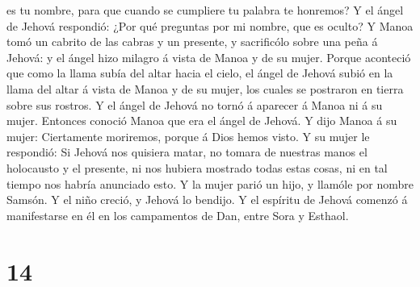 es tu nombre, para que cuando se cumpliere tu palabra te honremos?
 Y el ángel de Jehová respondió: ¿Por qué preguntas por
mi nombre, que es oculto?  Y Manoa tomó un cabrito de las
cabras y un presente, y sacrificólo sobre una peña á Jehová: y el ángel
hizo milagro á vista de Manoa y de su mujer.  Porque
aconteció que como la llama subía del altar hacia el cielo, el ángel de
Jehová subió en la llama del altar á vista de Manoa y de su mujer, los
cuales se postraron en tierra sobre sus rostros.  Y el
ángel de Jehová no tornó á aparecer á Manoa ni á su mujer. Entonces
conoció Manoa que era el ángel de Jehová.  Y dijo Manoa á
su mujer: Ciertamente moriremos, porque á Dios hemos visto.
 Y su mujer le respondió: Si Jehová nos quisiera matar,
no tomara de nuestras manos el holocausto y el presente, ni nos hubiera
mostrado todas estas cosas, ni en tal tiempo nos habría anunciado esto.
 Y la mujer parió un hijo, y llamóle por nombre Samsón. Y
el niño creció, y Jehová lo bendijo.  Y el espíritu de
Jehová comenzó á manifestarse en él en los campamentos de Dan, entre
Sora y Esthaol.

\hypertarget{section-13}{%
\section{14}\label{section-13}}

